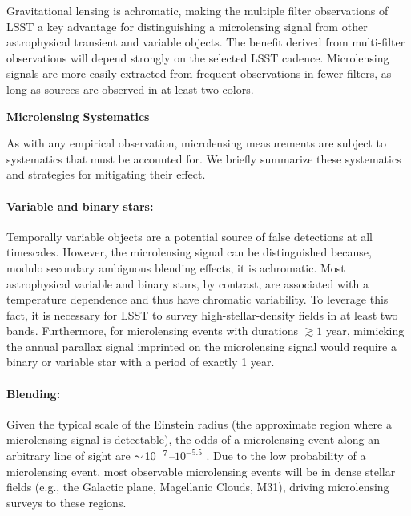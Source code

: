 

Gravitational lensing is achromatic, making the multiple filter observations of LSST a key advantage for distinguishing a microlensing signal from other astrophysical transient and variable objects.
The benefit derived from multi-filter observations will depend strongly on the selected LSST cadence. 
Microlensing signals are more easily extracted from frequent observations in fewer filters, as long as sources are observed in at least two colors. 


\noindent \textbf{Microlensing Systematics}

As with any empirical observation, microlensing measurements are subject to systematics that must be accounted for.
We briefly summarize these systematics and strategies for mitigating their effect.

\paragraph{Variable and binary stars:} Temporally variable objects are a potential source of false detections at all timescales. However, the microlensing signal can be distinguished because, modulo secondary ambiguous blending effects, it is achromatic. Most astrophysical variable and binary stars, by contrast, are associated with a temperature dependence and thus have chromatic variability. To leverage this fact, it is necessary for LSST to survey high-stellar-density fields in at least two bands. Furthermore, for microlensing events with durations $\gtrsim 1$ year, mimicking the annual parallax signal imprinted on the microlensing signal would require a binary or variable star with a period of exactly 1 year.

\paragraph{Blending:} Given the typical scale  of the Einstein radius (the approximate region where a microlensing signal is detectable), the odds of a microlensing event along an arbitrary line of sight are $ {\sim}\, 10^{-7}$--$10^{-5.5}$ \citep[\eg,][]{2000ApJ...541..734A,2006ApJ...636..240S}.
Due to the low probability of a microlensing event, most observable microlensing events will be in dense stellar fields (e.g., the Galactic plane, Magellanic Clouds, M31), driving microlensing surveys to these regions.

